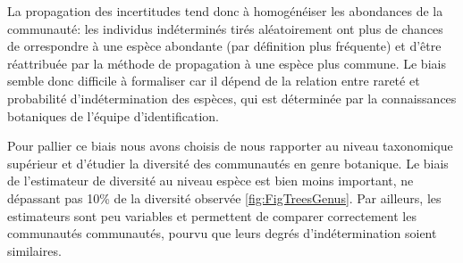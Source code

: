 \documentclass[
  11pt,
  french,
  A4paper,
  extrafontsizes,onecolumn,openright
  ]{memoir}
\begin{document}
La propagation des incertitudes tend donc à homogénéiser les abondances
de la communauté: les individus indéterminés tirés aléatoirement ont
plus de chances de orrespondre à une espèce abondante (par définition
plus fréquente) et d'être réattribuée par la méthode de propagation à
une espèce plus commune. Le biais semble donc difficile à formaliser car
il dépend de la relation entre rareté et probabilité d'indétermination
des espèces, qui est déterminée par la connaissances botaniques de
l'équipe d'identification.

Pour pallier ce biais nous avons choisis de nous rapporter au niveau
taxonomique supérieur et d'étudier la diversité des communautés en genre
botanique. Le biais de l'estimateur de diversité au niveau espèce est
bien moins important, ne dépassant pas 10\% de la diversité observée
\ref{fig:FigTreesGenus}. Par ailleurs, les estimateurs sont peu
variables et permettent de comparer correctement les communautés
communautés, pourvu que leurs degrés d'indétermination soient
similaires.
\end{document}
